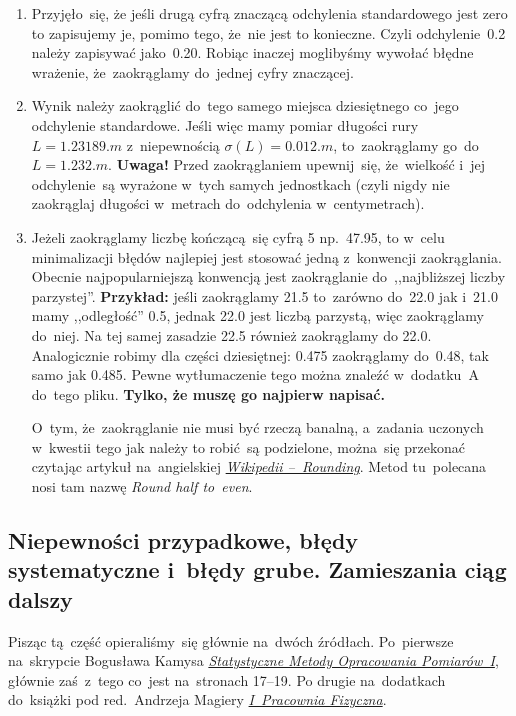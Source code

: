 \documentclass[a4paper,11pt]{article}
\newcommand{\tb}{\textbf}
\begin{document}
\begin{enumerate}
\item Przyjęło~się, że jeśli drugą cyfrą znaczącą odchylenia
  standardowego jest zero to zapisujemy je, pomimo tego, że~nie jest
  to konieczne. Czyli odchylenie~0.2 należy zapisywać jako~0.20.
  Robiąc inaczej moglibyśmy wywołać błędne wrażenie, że~zaokrąglamy
  do~jednej cyfry znaczącej.

\item Wynik należy zaokrąglić do~tego samego miejsca dziesiętnego
  co~jego odchylenie standardowe. Jeśli więc mamy pomiar długości rury
  $L = 1.23189 \si{.m}$ z~niepewnością $\sigma( L ) = 0.012 \si{.m}$,
  to~zaokrąglamy go~do~$L = 1.232 \si{.m}$. \tb{Uwaga!} Przed
  zaokrąglaniem upewnij~się, że~wielkość i~jej odchylenie~są wyrażone
  w~tych samych jednostkach (czyli nigdy nie zaokrąglaj długości
  w~metrach do~odchylenia w~centymetrach).

\item Jeżeli zaokrąglamy liczbę kończącą~się cyfrą 5 np.~47.95, to
  w~celu minimalizacji błędów najlepiej jest stosować jedną
  z~konwencji zaokrąglania. Obecnie najpopularniejszą konwencją jest
  zaokrąglanie do~,,najbliższej liczby parzystej''. \tb{Przykład:}
  jeśli zaokrąglamy 21.5 to~zarówno do~22.0 jak i~21.0 mamy
  ,,odległość'' 0.5, jednak 22.0 jest liczbą parzystą, więc
  zaokrąglamy do~niej. Na tej samej zasadzie 22.5 również zaokrąglamy
  do 22.0. Analogicznie robimy dla części dziesiętnej: 0.475
  zaokrąglamy do~0.48, tak samo jak 0.485. Pewne wytłumaczenie tego
  można znaleźć w~dodatku~A do~tego pliku. \tb{Tylko, że muszę go
    najpierw napisać.}

  O~tym, że~zaokrąglanie nie musi być rzeczą banalną, a~zadania
  uczonych w~kwestii tego jak należy to robić~są podzielone, można~się
  przekonać czytając artykuł na~angielskiej
  \href{https://en.wikipedia.org/wiki/Rounding}{\emph{Wikipedii
    --~Rounding}}. Metod tu~polecana nosi tam nazwę \emph{Round half
    to~even}.
\end{enumerate}





\subsection{Niepewności przypadkowe, błędy systematyczne i~błędy
  grube. Zamieszania ciąg dalszy}
\label{sec:niepewnosci}

Pisząc tą~część opieraliśmy~się głównie na~dwóch źródłach. Po~pierwsze
na~skrypcie Bogusława Kamysa
\href{http://users.uj.edu.pl/\~ufkamys/BK/smop1N\_h.pdf}{\emph{Statystyczne
    Metody Opracowania Pomiarów~I}}, głównie zaś~z~tego co~jest
na~stronach 17--19. Po drugie na~dodatkach do~książki pod
red.~Andrzeja Magiery
\href{http://www.1pf.if.uj.edu.pl/documents/5046939/5227638/skrypt.pdf}{\emph{I~Pracownia
    Fizyczna}}.
\end{document}
